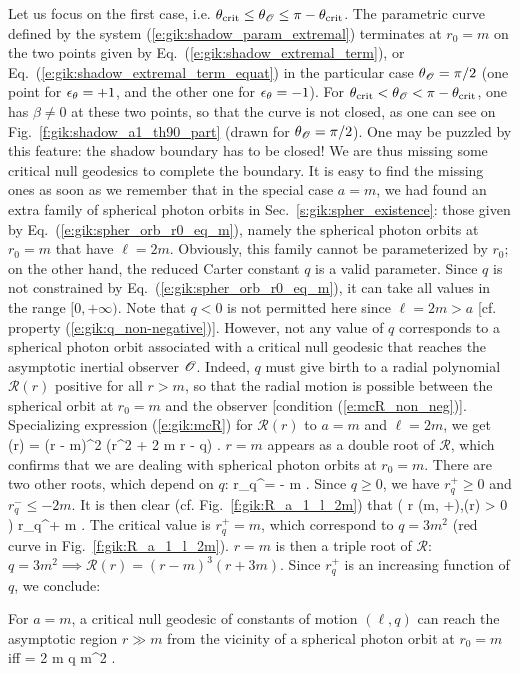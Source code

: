 Let us focus on the first case, i.e. $\theta_{\rm crit} \leq \theta_{\mathscr{O}} \leq \pi - \theta_{\rm crit}$.
The parametric curve defined by
the system (\ref{e:gik:shadow_param_extremal}) terminates at $r_0 = m$ on the two points
given by Eq.~(\ref{e:gik:shadow_extremal_term}), or Eq.~(\ref{e:gik:shadow_extremal_term_equat})
in the particular case $\theta_{\mathscr{O}} = \pi/2$ (one point for $\epsilon_\theta=+1$, and the other one
for $\epsilon_\theta=-1$). For $\theta_{\rm crit} < \theta_{\mathscr{O}} < \pi - \theta_{\rm crit}$, one has
$\beta \neq 0$ at these two points, so that the curve is not closed, as one can see
on Fig.~\ref{f:gik:shadow_a1_th90_part} (drawn for $\theta_{\mathscr{O}} = \pi/2$).
One may be puzzled by this feature: the shadow boundary has to be closed!
We are thus missing some critical null geodesics to complete the boundary.
It is easy to find the missing ones as soon as we remember that in the
special case $a=m$, we had found an extra family of spherical photon orbits
in Sec.~\ref{s:gik:spher_existence}: those given by Eq.~(\ref{e:gik:spher_orb_r0_eq_m}),
namely the spherical photon orbits at $r_0 = m$ that have
$\ell = 2m$. Obviously, this family cannot be parameterized by $r_0$; on the other hand,
the reduced Carter constant $q$ is a valid parameter. Since $q$ is
not constrained by Eq.~(\ref{e:gik:spher_orb_r0_eq_m}), it can take all
values in the range $[0, +\infty)$. Note that $q<0$ is not permitted here
since $\ell = 2 m > a$ [cf. property (\ref{e:gik:q_non-negative})].
However, not any value of $q$ corresponds to a spherical photon orbit associated
with a critical null geodesic that reaches the asymptotic inertial observer $\mathscr{O}$.
Indeed, $q$ must give birth to a radial polynomial
$\mathcal{R}(r)$ positive for all $r > m$, so that the radial
motion is possible between the spherical orbit at $r_0=m$
 and the observer [condition (\ref{e:mcR_non_neg})].
Specializing expression (\ref{e:gik:mcR}) for $\mathcal{R}(r)$ to $a=m$ and $\ell=2m$,
we get
\be
    (r) = (r - m)^2 (r^2 + 2 m r - q) .
\ee
$r = m$ appears as a double root of $\mathcal{R}$, which confirms that we are dealing
with spherical photon orbits at $r_0 = m$. There are two other roots, which depend
on $q$:
\be \label{e:gik:root_rq}
    r_q^\pm = \pm {} - m .
\ee
Since $q\geq 0$, we have $r_q^+ \geq 0$ and $r_q^- \leq - 2m$.
It is then clear (cf. Fig.~\ref{f:gik:R_a_1_l_2m}) that
\be
     \left( \forall r \in (m, +\infty),\quad  {}(r) > 0 \right) \iff r_q^+ \leq m .
\ee
The critical value is $r_q^+ = m$, which correspond to $q = 3 m^2$ (red curve
in Fig.~\ref{f:gik:R_a_1_l_2m}). $r=m$ is then a triple root of $\mathcal{R}$:
$q = 3 m^2 \implies \mathcal{R}(r) = ( r - m)^3 (r + 3m)$. Since $r_q^+$
is an increasing function of $q$, we conclude:
\begin{tprop}{}{}
For $a=m$, a critical null geodesic
of constants of motion $(\ell, q)$ can reach the asymptotic region $r\gg m$
from the vicinity of a spherical photon orbit at $r_0 = m$ iff
\be \label{e:gik:critical_from_NHEK}
    \ell = 2 m  \leq q  m^2 .
\ee
\end{tprop}

